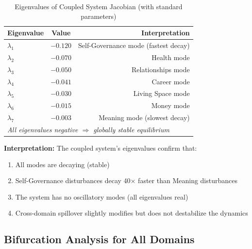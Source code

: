\begin{table}[htbp]
\centering
\caption{Eigenvalues of Coupled System Jacobian (with standard parameters)}
\label{tab:ooo-eigenvalues}
\renewcommand{\arraystretch}{1.2}
\small
\begin{tabular}{@{}lcr@{}}
\toprule
\textbf{Eigenvalue} & \textbf{Value} & \textbf{Interpretation} \\
\midrule
$\lambda_1$ & $-0.120$ & Self-Governance mode (fastest decay) \\
$\lambda_2$ & $-0.070$ & Health mode \\
$\lambda_3$ & $-0.050$ & Relationships mode \\
$\lambda_4$ & $-0.041$ & Career mode \\
$\lambda_5$ & $-0.030$ & Living Space mode \\
$\lambda_6$ & $-0.015$ & Money mode \\
$\lambda_7$ & $-0.003$ & Meaning mode (slowest decay) \\
\midrule
\multicolumn{3}{l}{\textit{All eigenvalues negative $\Rightarrow$ globally stable equilibrium}} \\
\bottomrule
\end{tabular}
\end{table}

\textbf{Interpretation:} The coupled system's eigenvalues confirm that:
\begin{enumerate}[nosep]
\item All modes are decaying (stable)
\item Self-Governance disturbances decay 40× faster than Meaning disturbances
\item The system has no oscillatory modes (all eigenvalues real)
\item Cross-domain spillover slightly modifies but does not destabilize the dynamics
\end{enumerate}

\subsection{Bifurcation Analysis for All Domains}

